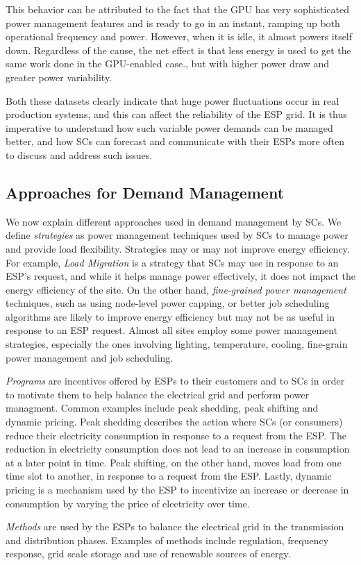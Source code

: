 This behavior can be attributed to the fact that the GPU has very sophisticated power management features and is ready to go in an instant, ramping up both operational frequency and power. However, when it is idle, it almost powers itself down.  Regardless of the cause, the net effect is that less energy is used to get the same work done in the GPU-enabled case., but with higher power draw and greater power variability.

Both these datasets clearly indicate that huge power fluctuations occur in real production systems, and this can affect the reliability of the ESP grid. It is thus imperative to understand how such variable power demands can be managed better, and how SCs can forecast and communicate with their ESPs more often to discuss and address such issues. 

\subsection{Approaches for Demand Management}
We now explain different approaches used in demand management by SCs. We define \emph{strategies} as power management techniques used by SCs to manage power and provide load flexibility. Strategies may or may not improve energy efficiency. For example, \emph{Load Migration} is a strategy that SCs may use in response to an ESP's request, and while it helps manage power effectively, it does not impact the energy efficiency of the site. On the other hand, \emph{fine-grained power management} techniques, such as using node-level power capping, or better job scheduling algorithms are likely to improve energy efficiency but may not be as useful in response to an ESP request. Almost all sites employ some power management strategies, especially the ones involving lighting, temperature, cooling, fine-grain power management and job scheduling. 

\emph{Programs} are incentives offered by ESPs to their customers and to SCs in order to motivate them to help balance the electrical grid and perform power managment. Common examples include peak shedding, peak shifting and dynamic pricing. Peak shedding describes the action where SCs (or consumers) reduce their electricity consumption in response to a request from the ESP. The reduction in electricity consumption does not lead to an increase in consumption at a later point in time. Peak shifting, on the other hand, moves load from one time slot to another, in response to a request from the ESP. Lastly, dynamic pricing is a mechanism used by the ESP to incentivize an increase or decrease in consumption by varying the price of electricity over time.

\emph{Methods} are used by the ESPs to balance the electrical grid in the transmission and distribution phases. Examples of methods include regulation, frequency response, grid scale storage and use of renewable sources of energy. 